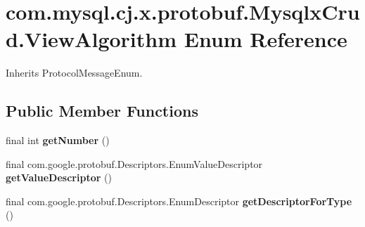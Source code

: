 \hypertarget{enumcom_1_1mysql_1_1cj_1_1x_1_1protobuf_1_1_mysqlx_crud_1_1_view_algorithm}{}\section{com.\+mysql.\+cj.\+x.\+protobuf.\+Mysqlx\+Crud.\+View\+Algorithm Enum Reference}
\label{enumcom_1_1mysql_1_1cj_1_1x_1_1protobuf_1_1_mysqlx_crud_1_1_view_algorithm}


Inherits Protocol\+Message\+Enum.

\subsection*{Public Member Functions}
\begin{DoxyCompactItemize}
\item 
\mbox{\label{enumcom_1_1mysql_1_1cj_1_1x_1_1protobuf_1_1_mysqlx_crud_1_1_view_algorithm_ab57c7c4de40e6b9664b878cd0444f8ec}} 
final int {\bfseries get\+Number} ()
\item 
\mbox{\label{enumcom_1_1mysql_1_1cj_1_1x_1_1protobuf_1_1_mysqlx_crud_1_1_view_algorithm_ac475550d12aa4a4cab6bb6d60fa00061}} 
final com.\+google.\+protobuf.\+Descriptors.\+Enum\+Value\+Descriptor {\bfseries get\+Value\+Descriptor} ()
\item 
\mbox{\label{enumcom_1_1mysql_1_1cj_1_1x_1_1protobuf_1_1_mysqlx_crud_1_1_view_algorithm_a5b72d0bf9e949157324b30a0665319d2}} 
final com.\+google.\+protobuf.\+Descriptors.\+Enum\+Descriptor {\bfseries get\+Descriptor\+For\+Type} ()
\end{DoxyCompactItemize}

